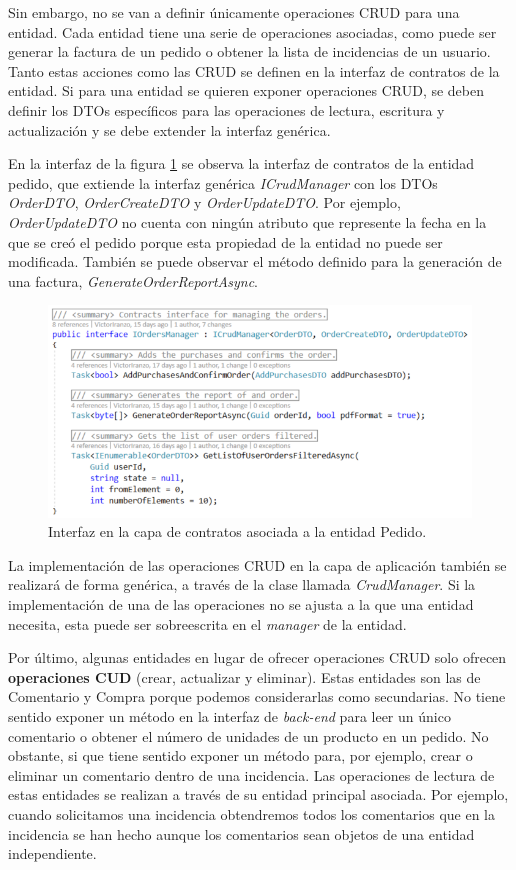 \documentclass[11pt,spanish,listoffigures]{tfgetsinf}
\begin{document}
Sin embargo, no se van a definir únicamente operaciones CRUD para una entidad. Cada entidad tiene una serie de operaciones asociadas, como puede ser generar la factura de un pedido o obtener la lista de incidencias de un usuario. Tanto estas acciones como las CRUD se definen en la interfaz de contratos de la entidad. Si para una entidad se quieren exponer operaciones CRUD, se deben definir los DTOs específicos para las operaciones de lectura, escritura y actualización y se debe extender la interfaz genérica. 

En la interfaz de la figura \ref{fig:IOrdersManager} se observa la interfaz de contratos de la entidad pedido, que extiende la interfaz genérica \textit{ICrudManager} con los DTOs \textit{OrderDTO}, \textit{OrderCreateDTO} y \textit{OrderUpdateDTO}. Por ejemplo, \textit{OrderUpdateDTO} no cuenta con ningún atributo que represente la fecha en la que se creó el pedido porque esta propiedad de la entidad no puede ser modificada. También se puede observar el método definido para la generación de una factura, \textit{GenerateOrderReportAsync}.

\begin{figure}[h]
\centering
\includegraphics[scale=0.8]{IOrdersManager}
\caption{Interfaz en la capa de contratos asociada a la entidad Pedido.}
\label{fig:IOrdersManager}
\end{figure}

La implementación de las operaciones CRUD en la capa de aplicación también se realizará de forma genérica, a través de la clase llamada \textit{CrudManager}. Si la implementación de una de las operaciones no se ajusta a la que una entidad necesita, esta puede ser sobreescrita en el \textit{manager} de la entidad.

Por último, algunas entidades en lugar de ofrecer operaciones CRUD solo ofrecen \textbf{operaciones CUD} (crear, actualizar y eliminar). Estas entidades son las de Comentario y Compra porque podemos considerarlas como secundarias. No tiene sentido exponer un método en la interfaz de \textit{back-end} para leer un único comentario o obtener el número de unidades de un producto en un pedido. No obstante, si que tiene sentido exponer un método para, por ejemplo, crear o eliminar un comentario dentro de una incidencia. Las operaciones de lectura de estas entidades se realizan a través de su entidad principal asociada. Por ejemplo, cuando solicitamos una incidencia obtendremos todos los comentarios que en la incidencia se han hecho aunque los comentarios sean objetos de una entidad independiente.
\end{document}
